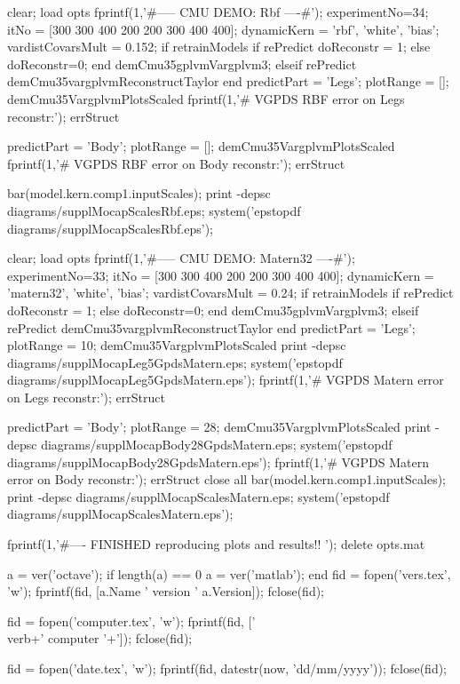 \documentclass{article} %
\newenvironment{matlab}{\comment}{\endcomment}
\begin{document}
\begin{matlab}

clear; load opts
fprintf(1,'\n\n#-----  CMU DEMO: Rbf ----#\n');
experimentNo=34; 
itNo = [300 300 400 200 200 300 400 400];
dynamicKern = {'rbf', 'white', 'bias'};
vardistCovarsMult = 0.152;
if retrainModels 
    if rePredict
        doReconstr = 1;
    else
        doReconstr=0;
    end
    demCmu35gplvmVargplvm3;
elseif rePredict
    demCmu35vargplvmReconstructTaylor
end
predictPart = 'Legs';  plotRange = [];
demCmu35VargplvmPlotsScaled
fprintf(1,'# VGPDS RBF error on Legs reconstr:');
errStruct

predictPart = 'Body';  plotRange = [];
demCmu35VargplvmPlotsScaled
fprintf(1,'# VGPDS RBF error on Body reconstr:');
errStruct

bar(model.kern.comp{1}.inputScales);
print -depsc diagrams/supplMocapScalesRbf.eps; system('epstopdf diagrams/supplMocapScalesRbf.eps');


clear; load opts
fprintf(1,'\n\n#-----  CMU DEMO: Matern32 ----#\n');
experimentNo=33; 
itNo = [300 300 400 200 200 300 400 400];
dynamicKern = {'matern32', 'white', 'bias'};
vardistCovarsMult = 0.24;
if retrainModels 
    if rePredict
        doReconstr = 1;
    else
        doReconstr=0;
    end
    demCmu35gplvmVargplvm3;
elseif rePredict
    demCmu35vargplvmReconstructTaylor
end
predictPart = 'Legs'; plotRange = 10;
demCmu35VargplvmPlotsScaled
print -depsc diagrams/supplMocapLeg5GpdsMatern.eps; system('epstopdf diagrams/supplMocapLeg5GpdsMatern.eps');
fprintf(1,'# VGPDS Matern error on Legs reconstr:');
errStruct

predictPart = 'Body'; plotRange = 28;
demCmu35VargplvmPlotsScaled
print -depsc diagrams/supplMocapBody28GpdsMatern.eps; system('epstopdf diagrams/supplMocapBody28GpdsMatern.eps');
fprintf(1,'# VGPDS Matern error on Body reconstr:');
errStruct
close all
bar(model.kern.comp{1}.inputScales);
print -depsc diagrams/supplMocapScalesMatern.eps; system('epstopdf diagrams/supplMocapScalesMatern.eps');


fprintf(1,'\n\n#---- FINISHED reproducing plots and results!! \n');
delete opts.mat


a = ver('octave');
if length(a) == 0
  a = ver('matlab');
end
fid = fopen('vers.tex', 'w');
fprintf(fid, [a.Name ' version ' a.Version]);
fclose(fid);

fid = fopen('computer.tex', 'w');
fprintf(fid, ['\\verb+' computer '+']);
fclose(fid);

fid = fopen('date.tex', 'w');
fprintf(fid, datestr(now, 'dd/mm/yyyy'));
fclose(fid);

\end{matlab}
\end{document}
